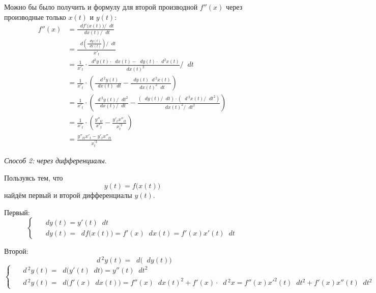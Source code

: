 \documentclass[a4paper,12pt]{article}
\newcommand{\diff}{\mathop{}\!d\!}
\begin{document}
\begin{solution}
    \begin{remark}
        Можно бы было получить и формулу для второй производной $f''(x)$ через производные только $x(t)$ и $y(t)$:
        \begin{equation*}
        \begin{split}
          f''(x) &= \frac{\diff f'\bigl(x(t)\bigr) / \!\diff t}{\diff x(t) / \!\diff t}\\
            &= \frac{\diff \left(\frac{\diff y(t)}{\diff x(t)}\right) / \!\diff t}{x'_t}\\
            &= \frac{1}{x'_t} \cdot \frac{\diff^2 y(t) \cdot \diff x(t) - \diff y(t) \cdot \diff^2 x(t)}{\diff x(t)^2} \Big/ \!\diff t\\
            &= \frac{1}{x'_t} \cdot \left(
              \frac{\diff\,^2 y(t)}{\diff x(t) \diff t} - \frac{\diff y(t) \diff\,^2 x(t)}{\diff x(t)^2 \diff t}
            \right)\\
            &= \frac{1}{x'_t} \cdot \left(
              \frac{\diff\,^2 y(t) / \!\diff t^2}{\diff x(t) / \!\diff t} - \frac{(\diff y(t) / \!\diff t) \cdot (\diff\,^2 x(t) / \!\diff t^2)}{\diff x(t)^2 / \!\diff t^2}
            \right)\\
            &= \frac{1}{x'_t} \cdot \left(
              \frac{y''_{tt}}{x'_t} - \frac{y'_t x''_{tt}}{x^{\prime 2}_t}
            \right)\\
            &= \frac{y''_{tt} x'_t - y'_t x''_{tt}}{x^{\prime 3}_t}
        \end{split}
        \end{equation*}
    \end{remark}

    \medskip
    
    \emph{Способ 2: через дифференциалы}.

    Пользуясь тем, что
    \[
      y(t) = f\bigl(x(t)\bigr)
    \]
    найдём первый и второй дифференциалы $y(t)$.

    Первый:
    \[
      \left\{
        \begin{aligned}
          &\diff y(t) = y'(t) \diff t\\
          &\diff y(t) = \diff f \bigl(x(t)\bigr)
            = f'(x) \diff x(t) = f'(x) x'(t) \diff t
        \end{aligned}
      \right.
    \]

    Второй:
    \[
      \diff\,^2 y(t) = \diff \bigl(\diff y(t)\bigr)
    \]
    \[
      \left\{
        \begin{aligned}
          &\diff\,^2 y(t) = \diff \bigl(y'(t) \diff t\bigr) = y''(t) \diff t^2\\
          &\diff\,^2 y(t) = \diff \bigl(f'(x) \diff x(t)\bigr)
            = f''(x) \diff x(t)^2 + f'(x) \cdot \diff\,^2 x
            = f''(x) x'^2(t) \diff t^2 + f'(x) x''(t) \diff t^2
        \end{aligned}
      \right.
    \]


\end{solution}
\end{document}
